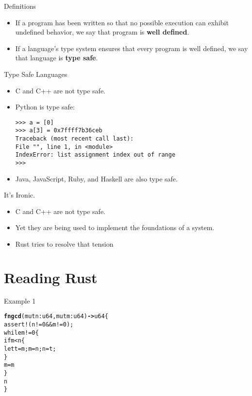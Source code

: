 \documentclass[aspectratio=1610,t]{beamer}
\newcommand\hi[1]{{\color{mainorange} \textbf{#1}}}
\begin{document}

\begin{frame}{Definitions}
	\begin{itemize}
		\item If a program has been written so that no possible execution can
			exhibit undefined behavior, we say that program is \textbf{well defined}.
		\item If a language’s type system ensures that every program is well
			defined, we say that language is \textbf{type safe}.
	\end{itemize}
\end{frame}


\begin{frame}[fragile]{Type Safe Languages}
	\begin{itemize}
		\item C and C++ are not type safe.
		\item Python is type safe:
\begin{verbatim}
>>> a = [0]
>>> a[3] = 0x7ffff7b36ceb
Traceback (most recent call last):
File "", line 1, in <module>
IndexError: list assignment index out of range
>>>
\end{verbatim}
		\item Java, JavaScript, Ruby, and Haskell are also type safe.
	\end{itemize}
\end{frame}


\begin{frame}{It's Ironic.}
	\begin{itemize}
		\item C and C++ are not type safe.
		\item Yet they are being used to implement the foundations of a system.
		\item Rust tries to resolve that tension
	\end{itemize}
\end{frame}


\section{Reading Rust}


\begin{frame}[fragile]{Example 1}
\begin{alltt}
\hi{fn gcd}(mut n: u64, mut m: u64) \hi{->} u64 \{
    assert!(n != 0 && m != 0);
    while m != 0 \{
        if m < n \{
            let t = m; m = n; n = t;
        \}
        m = m % n;
    \}
    n
\}
\end{alltt}
\end{frame}
\end{document}
